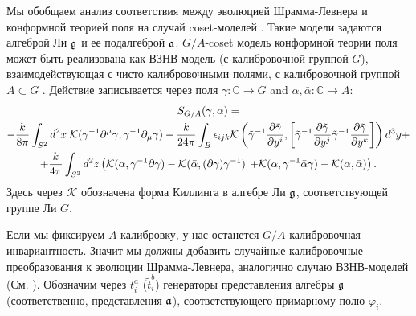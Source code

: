 \documentclass[14pt,autoref,href,facsimile
]{disser}
\begin{document}
Мы обобщаем анализ соответствия между эволюцией Шрамма-Левнера и конформной теорией поля на случай coset-моделей \cite{Goddard198588}. Такие модели задаются алгеброй Ли $\mathfrak{g}$ и ее подалгеброй $\mathfrak{a}$. 
$G/A$-coset модель конформной теории поля может быть реализована как ВЗНВ-модель (с калибровочной группой $G$), взаимодействующая с чисто калибровочными полями, с калибровочной группой $A\subset G$ \cite{gawdzki1988g,figueroa89equivalence}. Действие записывается через поля $\gamma:\mathbb{C}\to G$ and $\alpha,\bar\alpha:\mathbb{C}\to A$:
\begin{multline}
\label{eq:178}
      S_{G/A}(\gamma, \alpha)=\\
-\frac{k}{8\pi}\int_{S^2} d^2x\; {\cal K} (\gamma^{-1}\partial^{\mu}\gamma,\gamma^{-1}\partial_{\mu}\gamma)-
 \frac{k }{24\pi} \int_{B}\epsilon_{ijk} {\cal K}\left(
    \tilde \gamma^{-1}\frac{\partial \tilde \gamma}{\partial y^i},
      \left[\tilde \gamma^{-1}\frac{\partial \tilde \gamma}{\partial y^j}
      \tilde \gamma^{-1}\frac{\partial \tilde \gamma}{\partial y^k}\right]\right) d^3y+\\
+
      \frac{k}{4\pi}\int_{S^2} d^{2}z \left(\mathcal{K}(\alpha, \gamma^{-1}\bar \partial \gamma)-\mathcal{K}(\bar \alpha, (\partial \gamma ) \gamma^{-1})\right.
      \left.+\mathcal{K}(\alpha,\gamma^{-1}\bar \alpha \gamma)-\mathcal{K}(\alpha,\bar \alpha)\right).
\end{multline}
Здесь через  $\mathcal{K}$ обозначена форма Киллинга в алгебре Ли $\mathfrak{g}$, соответствующей группе Ли $G$.

Если мы фиксируем  $A$-калибровку, у нас останется  $G/A$ калибровочная инвариантность. Значит мы должны добавить случайные калибровочные преобразования к эволюции Шрамма-Левнера, аналогично случаю ВЗНВ-моделей  (См. \cite{bettelheim2005stochastic}).  Обозначим через $t^{a}_{i}$ ($\tilde{t}^{b}_{i}$) генераторы представления алгебры $\mathfrak{g}$ (соответственно, представления $\mathfrak{a}$), соответствующего примарному полю $\varphi_{i}$.
\end{document}
